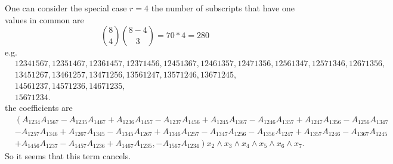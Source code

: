\documentclass[aps, preprint]{revtex4}
\begin{document}
One can consider the special case $r =4$ the number of subscripts that have one values in common are
\begin{equation}\binom{8}{4} \binom{8 -4}{3} =70 \ast 4 =280
\end{equation}e.g.
\begin{align} & 12341567,12351467,12361457,12371456,12451367,12461357,12471356,12561347,12571346,12671356 , \nonumber  \\
 & 13451267,13461257,13471256,13561247,13571246,13671245 , \nonumber  \\
 & 14561237,14571236,14671235 , \nonumber  \\
 & 15671234.\end{align}the coefficients are
\begin{align} & \left (A_{1 2 3 4} A_{1 5 6 7} -A_{1 2 3 5} A_{1 4 6 7} +A_{1 2 3 6} A_{1 4 5 7} -A_{1 2 3 7} A_{1 4 5 6} +A_{1 2 4 5} A_{1 3 6 7} -A_{1 2 4 6} A_{1 3 5 7} +A_{1 2 4 7} A_{1 3 5 6} -A_{1 2 5 6} A_{1 3 4 7}\right . \nonumber  \\
 &  -A_{1 2 5 7} A_{1 3 4 6} +A_{1 2 6 7} A_{1 3 4 5} -A_{1 3 4 5} A_{1 2 6 7} +A_{1 3 4 6} A_{1 2 5 7} -A_{1 3 4 7} A_{1 2 5 6} -A_{1 3 5 6} A_{1 2 4 7} +A_{1 3 5 7} A_{1 2 4 6} -A_{1 3 6 7} A_{1 2 4 5} \nonumber  \\
 & \left . +A_{1 4 5 6} A_{1 2 3 7} -A_{1 4 5 7} A_{1 2 3 6} +A_{1 4 6 7} A_{1 2 3 5} , -A_{1 5 6 7} A_{1 2 3 4}\right )x_{2} \wedge x_{3} \wedge x_{4} \wedge x_{5} \wedge x_{6} \wedge x_{7}\text{.}\end{align}So it seems that this term cancels. 
\end{document}
